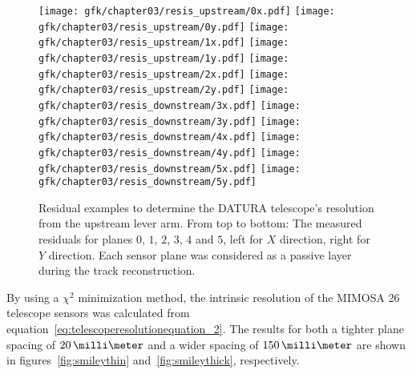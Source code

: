 \begin{figure}[hbtp]
\centering
\texttt{[image: gfk/chapter03/resis\_upstream/0x.pdf]}
\texttt{[image: gfk/chapter03/resis\_upstream/0y.pdf]}
\texttt{[image: gfk/chapter03/resis\_upstream/1x.pdf]}
\texttt{[image: gfk/chapter03/resis\_upstream/1y.pdf]}
\texttt{[image: gfk/chapter03/resis\_upstream/2x.pdf]}
\texttt{[image: gfk/chapter03/resis\_upstream/2y.pdf]}
\texttt{[image: gfk/chapter03/resis\_downstream/3x.pdf]}
\texttt{[image: gfk/chapter03/resis\_downstream/3y.pdf]}
\texttt{[image: gfk/chapter03/resis\_downstream/4x.pdf]}
\texttt{[image: gfk/chapter03/resis\_downstream/4y.pdf]}
\texttt{[image: gfk/chapter03/resis\_downstream/5x.pdf]}
\texttt{[image: gfk/chapter03/resis\_downstream/5y.pdf]}
\caption[Residual examples to determine the DATURA telescope's
resolution. Upstream lever arm]{Residual examples to determine the DATURA
telescope's resolution from the upstream lever arm. From top to bottom: The
measured residuals for planes $0$, $1$, $2$, $3$, $4$ and $5$, left for $X$
direction, right for $Y$ direction. Each sensor plane was considered as a
passive layer during the track reconstruction.}
\label{fig:residualexample1}
\end{figure}

\begin{comment}

\begin{figure}[hbtp]
\centering


\caption[Residual examples to determine the DATURA telescope's
resolution. Downstream lever arm]{Residual examples to determine the DATURA
telescope's resolution from the downstream lever arm. From top to bottom: The
measured residuals for planes $3$, $4$ and $5$, left for $X$ direction, right
for $Y$ direction. Each sensor plane was considered as a passive layer during
the track reconstruction.}
\label{fig:residualexample2}
\end{figure}

\end{comment}

By using a $\chi^{2}$ minimization method, the intrinsic resolution of the
{MIMOSA 26} telescope sensors was calculated from
equation~\ref{eq:telescoperesolutionequation_2}. The results for both a tighter
plane spacing of $20\,\milli\meter$ and a wider spacing of $150\,\milli\meter$
are shown in figures~\ref{fig:smileythin} and~\ref{fig:smileythick},
respectively.\\


